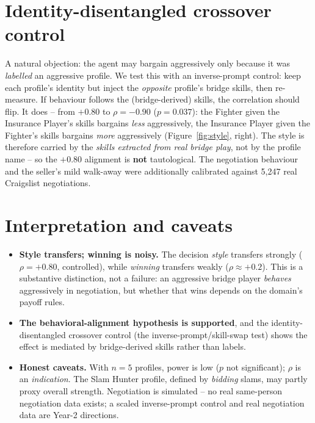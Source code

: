 \documentclass[11pt, a4paper, oneside, openany]{report}
\begin{document}
\section{Identity-disentangled crossover control}

A natural objection: the agent may bargain aggressively only because it was \emph{labelled} an aggressive profile. We test this with an inverse-prompt control: keep each profile's identity but inject the \emph{opposite} profile's bridge skills, then re-measure. If behaviour follows the (bridge-derived) skills, the correlation should flip. It does -- from $+0.80$ to $\rho = -0.90$ ($p = 0.037$): the Fighter given the Insurance Player's skills bargains \emph{less} aggressively, the Insurance Player given the Fighter's skills bargains \emph{more} aggressively (Figure~\ref{fig:style}, right). The style is therefore carried by the \emph{skills extracted from real bridge play}, not by the profile name -- so the $+0.80$ alignment is \textbf{not} tautological. The negotiation behaviour and the seller's mild walk-away were additionally calibrated against 5{,}247 real Craigslist negotiations.

\section{Interpretation and caveats}

\begin{itemize}[leftmargin=*]
    \item \textbf{Style transfers; winning is noisy.} The decision \emph{style} transfers strongly ($\rho = +0.80$, controlled), while \emph{winning} transfers weakly ($\rho \approx +0.2$). This is a substantive distinction, not a failure: an aggressive bridge player \emph{behaves} aggressively in negotiation, but whether that wins depends on the domain's payoff rules.
    \item \textbf{The behavioral-alignment hypothesis is supported}, and the identity-disentangled crossover control (the inverse-prompt/skill-swap test) shows the effect is mediated by bridge-derived skills rather than labels.
    \item \textbf{Honest caveats.} With $n = 5$ profiles, power is low ($p$ not significant); $\rho$ is an \emph{indication}. The Slam Hunter profile, defined by \emph{bidding} slams, may partly proxy overall strength. Negotiation is simulated -- no real same-person negotiation data exists; a scaled inverse-prompt control and real negotiation data are Year-2 directions.
\end{itemize}
\end{document}
